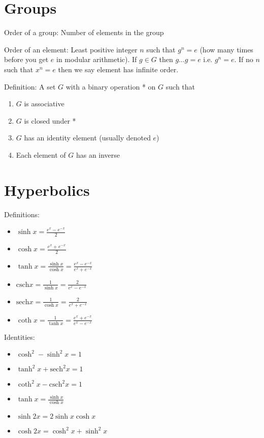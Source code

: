 \documentclass[10pt,a4paper,oneside]{book}
\begin{document}
\section*{Groups}
Order of a group: Number of elements in the group 

Order of an element: Least positive integer $n$ such that $g^n=e$ (how many times before you get $e$ in modular arithmetic). If $g\in G$ then $g\dots g=e$ i.e. $g^n=e$. 
If no $n$ such that $x^n=e$ then we say element has infinite order.

Definition: A set $G$ with a binary operation * on $G$ such that 
\begin{enumerate}
    \item $G$ is associative 
    \item $G$ is closed under * 
    \item $G$ has an identity element (usually denoted $e$)
    \item Each element of $G$ has an inverse 
\end{enumerate}

\section*{Hyperbolics}
Definitions:
\begin{itemize}
    \item $\sinh x = \frac{e^x-e^{-x}}{2}$
    \item $\cosh x = \frac{e^x+e^{-x}}{2}$
    \item $\tanh x = \frac{\sinh x}{\cosh x} = \frac{e^x-e^{-x}}{e^x+e^{-x}}$
    \item $\text{csch} x = \frac{1}{\sinh x} = \frac{2}{e^x-e^{-x}}$
    \item $\text{sech} x = \frac{1}{\cosh x} = \frac{2}{e^x+e^{-x}}$
    \item $\coth x = \frac{1}{\tanh x} = \frac{e^x+e^{-x}}{e^x-e^{-x}}$
\end{itemize}

Identities:
\begin{itemize}
    \item $\cosh^2 - \sinh^2 x = 1$
    \item $\tanh^2 x + \text{sech}^2 x = 1$
    \item $\coth^2 x - \text{csch}^2 x = 1$
    \item $\tanh x = \frac{\sinh x}{\cosh x}$
    \item $\sinh 2x = 2\sinh x \cosh x$
    \item $\cosh 2x = \cosh^2 x + \sinh^2 x$
\end{itemize}
\end{document}
